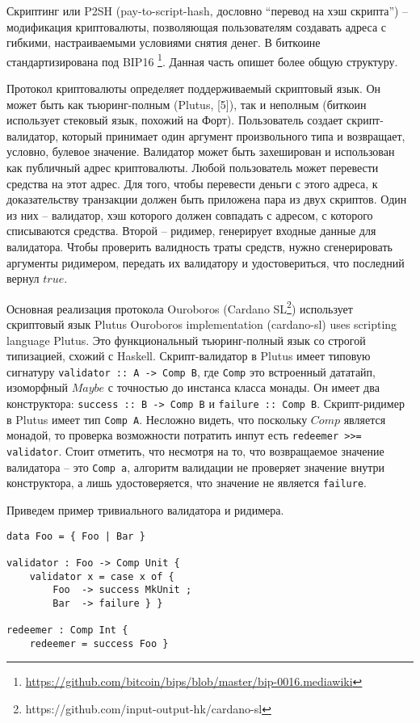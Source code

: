 \documentclass[]{itmo-student-thesis}
\begin{document}
Скриптинг или P2SH (pay-to-script-hash, дословно ``перевод на хэш
скрипта'') -- модификация криптовалюты, позволяющая пользователям
создавать адреса с гибкими, настраиваемыми условиями снятия денег. В
биткоине стандартизирована под
BIP16 \footnote{\url{https://github.com/bitcoin/bips/blob/master/bip-0016.mediawiki}}. Данная
часть опишет более общую структуру.

Протокол криптовалюты определяет поддерживаемый скриптовый язык. Он
может быть как тьюринг-полным (Plutus, [5]), так и неполным (биткоин
использует стековый язык, похожий на Форт). Пользователь создает
скрипт-валидатор, который принимает один аргумент произвольного типа и
возвращает, условно, булевое значение. Валидатор может быть
захеширован и использован как публичный адрес криптовалюты. Любой
пользователь может перевести средства на этот адрес. Для того, чтобы
перевести деньги с этого адреса, к доказательству транзакции должен
быть приложена пара из двух скриптов. Один из них -- валидатор, хэш
которого должен совпадать с адресом, с которого списываются
средства. Второй -- ридимер, генерирует входные данные для
валидатора. Чтобы проверить валидность траты средств, нужно
сгенерировать аргументы ридимером, передать их валидатору и
удостовериться, что последний вернул $true$.

Основная реализация протокола Ouroboros (Cardano
SL\footnote{https://github.com/input-output-hk/cardano-sl}) использует
скриптовый язык Plutus Ouroboros implementation (cardano-sl) uses
scripting language Plutus. Это функциональный тьюринг-полный язык со
строгой типизацией, схожий с Haskell. Скрипт-валидатор в Plutus имеет
типовую сигнатуру \lstinline|validator :: A -> Comp B|, где
\lstinline|Comp| это встроенный дататайп, изоморфный $Maybe$ с
точностью до инстанса класса монады. Он имеет два конструктора:
\lstinline|success :: B -> Comp B| и \lstinline|failure :: Comp B|.
Скрипт-ридимер в Plutus имеет тип \lstinline|Comp A|. Несложно
видеть, что поскольку $Comp$ является монадой, то проверка возможности
потратить инпут есть \lstinline|redeemer >>= validator|. Стоит
отметить, что несмотря на то, что возвращаемое значение валидатора --
это \lstinline|Comp a|, алгоритм валидации не проверяет значение
внутри конструктора, а лишь удостоверяется, что значение не является
\lstinline|failure|.

Приведем пример тривиального валидатора и ридимера.

\begin{lstlisting}[float=!h,caption={Пример пары валидатор/ридимер на Plutus}]
data Foo = { Foo | Bar }

validator : Foo -> Comp Unit {
    validator x = case x of {
        Foo  -> success MkUnit ;
        Bar  -> failure } }

redeemer : Comp Int {
    redeemer = success Foo }
\end{lstlisting}
\end{document}
